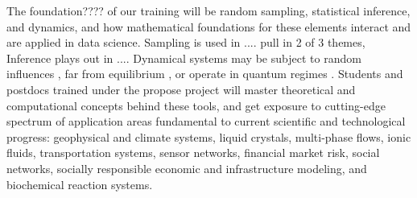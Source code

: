 \documentclass[11pt]{NSFamsart}
\begin{document}
The  foundation???? of our training will be random sampling, statistical inference, and dynamics, and how mathematical foundations for these elements interact and are applied in data science. 
Sampling is used in .... {\color{magenta}pull in 2 of 3 themes}, Inference plays out in ....  Dynamical systems may be subject to random influences \cite{Arnold, DuanBook2015}, far from equilibrium \cite{liu2009introduction}, or operate in quantum regimes \cite{Dittrich2016}. 
Students and postdocs trained under the propose project will master theoretical and computational concepts behind these tools, and get exposure to cutting-edge spectrum of application areas fundamental to current scientific and technological progress: geophysical and climate systems, liquid crystals, multi-phase flows, ionic fluids,  transportation systems, sensor networks, financial market risk, social networks, socially responsible economic and infrastructure modeling, and biochemical reaction systems. 
\end{document}
